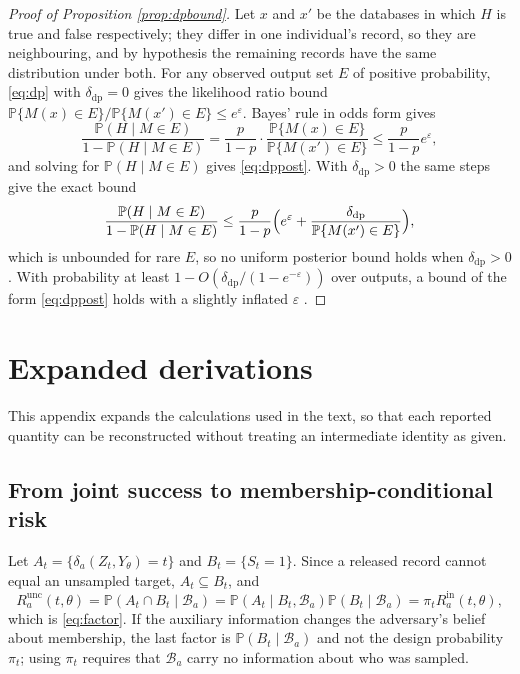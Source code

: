 \documentclass[11pt,a4paper]{article}
\theoremstyle{plain}
\theoremstyle{definition}
\newcommand{\Prob}{\mathbb{P}}
\begin{document}
\begin{proof}[Proof of Proposition \ref{prop:dpbound}]
Let $x$ and $x'$ be the databases in which $H$ is true and false respectively;
they differ in one individual's record, so they are neighbouring, and by
hypothesis the remaining records have the same distribution under both. For any
observed output set $E$ of positive probability, \eqref{eq:dp} with
$\delta_{\mathrm{dp}} = 0$ gives the likelihood ratio bound
$\Prob\{M(x) \in E\} / \Prob\{M(x') \in E\} \leq e^\varepsilon$. Bayes' rule in odds form gives
\[
\frac{\Prob(H \mid M \in E)}{1 - \Prob(H \mid M \in E)}
= \frac{p}{1-p}\cdot\frac{\Prob\{M(x) \in E\}}{\Prob\{M(x') \in E\}}
\leq \frac{p}{1-p}e^{\varepsilon} ,
\]
and solving for $\Prob(H \mid M \in E)$ gives \eqref{eq:dppost}. With
$\delta_{\mathrm{dp}} > 0$ the same steps give the exact bound
\[
\frac{\Prob(H \mid M \in E)}{1 - \Prob(H \mid M \in E)}
\leq \frac{p}{1-p}\Bigl(e^{\varepsilon}
+ \frac{\delta_{\mathrm{dp}}}{\Prob\{M(x') \in E\}}\Bigr) ,
\]
which is unbounded for rare $E$, so no uniform posterior bound holds when
$\delta_{\mathrm{dp}} > 0$. With probability at least
$1 - O(\delta_{\mathrm{dp}}/(1-e^{-\varepsilon}))$ over outputs, a bound of the
form \eqref{eq:dppost} holds with a slightly inflated $\varepsilon$
\citep{kasiviswanathan2014}.
\end{proof}

\section{Expanded derivations}\label{app:derivations}

This appendix expands the calculations used in the text, so that each reported
quantity can be reconstructed without treating an intermediate identity as
given.

\subsection{From joint success to membership-conditional risk}

Let $A_t=\{\delta_a(Z_t,Y_\theta)=t\}$ and $B_t=\{S_t=1\}$. Since a released
record cannot equal an unsampled target, $A_t\subseteq B_t$, and
\begin{equation}
R_a^{\mathrm{unc}}(t,\theta)
 =\Prob(A_t\cap B_t\mid\mathcal{B}_a)
 =\Prob(A_t\mid B_t,\mathcal{B}_a)\Prob(B_t\mid\mathcal{B}_a)
 =\pi_t R_a^{\mathrm{in}}(t,\theta),
\end{equation}
which is \eqref{eq:factor}. If the auxiliary information changes the adversary's
belief about membership, the last factor is $\Prob(B_t\mid\mathcal{B}_a)$ and not
the design probability $\pi_t$; using $\pi_t$ requires that $\mathcal{B}_a$ carry
no information about who was sampled.
\end{document}
